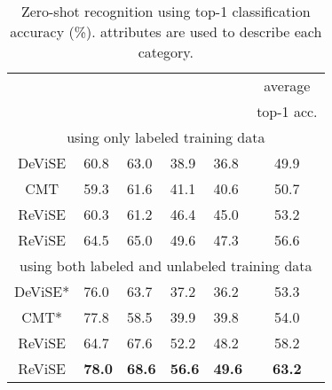 {\begin{table}[t!]
\centering
\caption{\footnotesize Zero-shot recognition using top-1 classification accuracy (\%).  attributes are used to describe each category.}
\vspace{1mm}
\scalebox{0.72}
{
\begin{tabular}{|c||ll||ll||c|}
\hline
 & \multicolumn{2}{c||}{}                                                      & \multicolumn{2}{c||}{}                                                     & average                          \\
                        & \multicolumn{1}{c}{} & \multicolumn{1}{c||}{} & \multicolumn{1}{c}{} & \multicolumn{1}{c||}{} & top-1 acc. \\ \hline\hline
\multicolumn{6}{|c|}{using only labeled training data}                                                                                                                                                                                     \\ \hline \hline
DeViSE \cite{frome2013devise}                         &        60.8        &          63.0         &       38.9       &              36.8            &        49.9                       \\
CMT \cite{socher2013zero}                 &    59.3      &    61.6   &         41.1   &        40.6         &    50.7                 \\
ReViSE        &     60.3      &      61.2        &    46.4      &        45.0      &        53.2              \\
ReViSE        &     64.5           &     65.0         &     49.6         &              47.3            &      56.6               \\ \hline \hline
\multicolumn{6}{|c|}{using both labeled and unlabeled training data}   \\ \hline \hline
DeViSE* \cite{frome2013devise}             &   76.0        &       63.7       &     37.2    &          36.2          &    53.3             \\
CMT* \cite{socher2013zero}       &    77.8     &       58.5     &     39.9      &              39.8          &   54.0              \\
ReViSE        &   64.7         &     67.6        &   52.2     &    48.2   &       58.2        \\
ReViSE       &    {\bf 78.0  }      &   {\bf 68.6   }   &     {\bf 56.6   }   &  {\bf 49.6    }  &        {\bf 63.2}           \\ \hline
\end{tabular}
}
\label{tbl:induc_zero_recog}
\vspace{-1mm}
\end{table}

}
